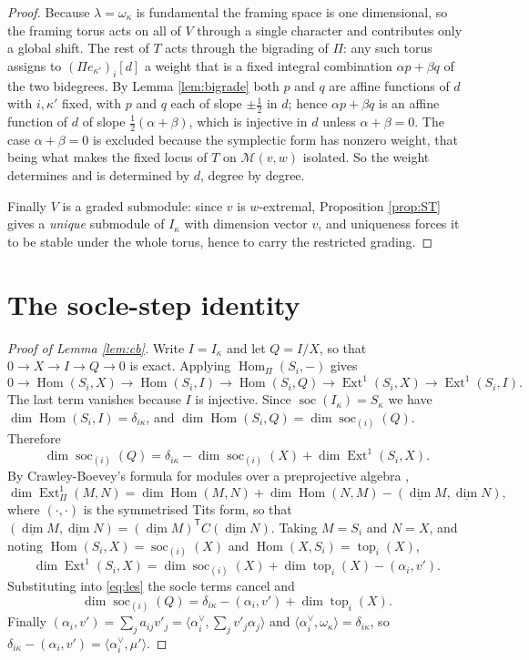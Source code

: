 \documentclass[11pt,reqno]{amsart}
\theoremstyle{plain}
\theoremstyle{definition}
\DeclareMathOperator{\soc}{soc}
\DeclareMathOperator{\topp}{top}
\DeclareMathOperator{\Hom}{Hom}
\DeclareMathOperator{\Ext}{Ext}
\newcommand{\Pia}{\Pi}
\newcommand{\dimv}{\underline{\dim}}
\newcommand{\al}{\alpha}
\newcommand{\om}{\omega}
\newcommand{\la}{\lambda}
\newcommand{\ka}{\kappa}
\newcommand{\Mvw}{\mathcal{M}}
\begin{document}
\begin{proof}
Because $\la=\om_\ka$ is fundamental the framing space is one dimensional, so
the framing torus acts on all of $V$ through a single character and contributes
only a global shift.  The rest of $T$ acts through the bigrading of $\Pia$: any
such torus assigns to $(\Pia e_{\ka'})_i[d]$ a weight that is a fixed integral
combination $\alpha p+\beta q$ of the two bidegrees.  By Lemma \ref{lem:bigrade} both
$p$ and $q$ are affine functions of $d$ with $i,\ka'$ fixed, with $p$ and $q$
each of slope $\pm\frac12$ in $d$; hence $\alpha p+\beta q$ is an affine function of $d$
of slope $\frac12(\alpha+\beta)$, which is injective in $d$ unless
$\alpha+\beta=0$.  The case $\alpha+\beta=0$ is excluded because the
symplectic form has nonzero weight, that being what makes the fixed locus of
$T$ on $\Mvw(v,w)$ isolated.  So the weight determines and is determined by
$d$, degree by degree.

Finally $V$ is a graded submodule: since $v$ is $w$-extremal, Proposition
\ref{prop:ST} gives a \emph{unique} submodule of $I_\ka$ with dimension vector
$v$, and uniqueness forces it to be stable under the whole torus, hence to
carry the restricted grading.
\end{proof}

\section{The socle-step identity}\label{sec:identity}

\begin{proof}[Proof of Lemma \ref{lem:cb}]
Write $I=I_\ka$ and let $Q=I/X$, so that $0\to X\to I\to Q\to0$ is exact.
Applying $\Hom_\Pia(S_i,-)$ gives
\[
0\to\Hom(S_i,X)\to\Hom(S_i,I)\to\Hom(S_i,Q)\to\Ext^1(S_i,X)\to\Ext^1(S_i,I).
\]
The last term vanishes because $I$ is injective.  Since $\soc(I_\ka)=S_\ka$ we
have $\dim\Hom(S_i,I)=\delta_{i\ka}$, and $\dim\Hom(S_i,Q)=\dim\soc_{(i)}(Q)$.
Therefore
\begin{equation}\label{eq:les}
  \dim\soc_{(i)}(Q)=\delta_{i\ka}-\dim\soc_{(i)}(X)+\dim\Ext^1(S_i,X).
\end{equation}
By Crawley-Boevey's formula for modules over a preprojective algebra
\cite[Lem.~1]{CB},
\[
  \dim\Ext^1_\Pia(M,N)=\dim\Hom(M,N)+\dim\Hom(N,M)-(\dimv M,\dimv N),
\]
where $(\cdot,\cdot)$ is the symmetrised Tits form, so that
$(\dimv M,\dimv N)=(\dimv M)^{\mathsf T}C(\dimv N)$.  Taking $M=S_i$ and
$N=X$, and noting $\Hom(S_i,X)=\soc_{(i)}(X)$ and $\Hom(X,S_i)=\topp_i(X)$,
\[
  \dim\Ext^1(S_i,X)=\dim\soc_{(i)}(X)+\dim\topp_i(X)-(\al_i,v').
\]
Substituting into \eqref{eq:les} the socle terms cancel and
\[
  \dim\soc_{(i)}(Q)=\delta_{i\ka}-(\al_i,v')+\dim\topp_i(X).
\]
Finally $(\al_i,v')=\sum_j a_{ij}v'_j=\langle\al_i^\vee,\sum_jv'_j\al_j\rangle$
and $\langle\al_i^\vee,\om_\ka\rangle=\delta_{i\ka}$, so
$\delta_{i\ka}-(\al_i,v')=\langle\al_i^\vee,\mu'\rangle$.
\end{proof}
\end{document}
